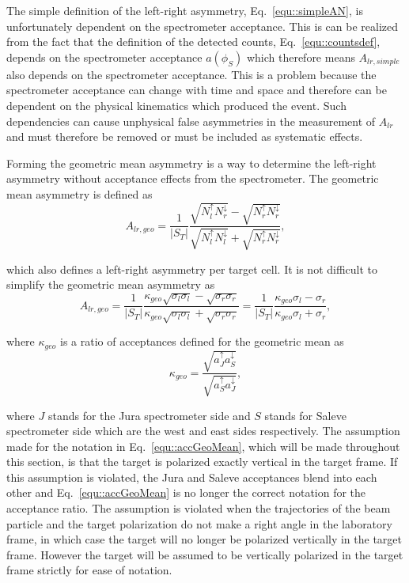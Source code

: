 The simple definition of the left-right asymmetry, Eq.~\ref{equ::simpleAN}, is
unfortunately dependent on the spectrometer acceptance.  This is can be realized
from the fact that the definition of the detected counts,
Eq.~\ref{equ::countsdef}, depends on the spectrometer acceptance $a(\phi_S)$
which therefore means $A_{lr,simple}$ also depends on the spectrometer
acceptance.  This is a problem because the spectrometer acceptance can change
with time and space and therefore can be dependent on the physical kinematics
which produced the event.  Such dependencies can cause unphysical false
asymmetries in the measurement of $A_{lr}$ and must therefore be removed or must
be included as systematic effects. \par

Forming the geometric mean asymmetry is a way to determine the left-right
asymmetry without acceptance effects from the spectrometer.  The geometric mean
asymmetry is defined as
\begin{equation}
  \label{equ::ANgeomean}
  A_{lr,geo} =
  \frac{1}{|S_T|}
  \frac{\sqrt{N_l^{\uparrow}N_r^{\downarrow}}
    - \sqrt{N_r^{\uparrow}N_r^{\downarrow}}
  }{
    \sqrt{N_l^{\uparrow}N_l^{\downarrow}}
    + \sqrt{N_r^{\uparrow}N_r^{\downarrow}} },
\end{equation}

\noindent
which also defines a left-right asymmetry per target cell.  It is not difficult
to simplify the geometric mean asymmetry as
\begin{equation}
  \label{equ::ANgeomean_expand}
  A_{lr,geo} = \frac{1}{|S_T|}\frac{\kappa_{geo}
    \sqrt{\sigma_l\sigma_l} -
    \sqrt{\sigma_r\sigma_r}}{\kappa_{geo}
    \sqrt{\sigma_l\sigma_l} + \sqrt{\sigma_r\sigma_r}}
  = \frac{1}{|S_T|}\frac{\kappa_{geo}\sigma_l - \sigma_r}{
    \kappa_{geo}\sigma_l + \sigma_r},
\end{equation}

\noindent
where $\kappa_{geo}$ is a ratio of acceptances defined for the geometric mean as
\begin{equation}
  \kappa_{geo} =
  \frac{
    \sqrt{a^\uparrow_J a^\downarrow_S}
    }{
    \sqrt{a^\uparrow_S a^\downarrow_J}
  },
  \label{equ::accGeoMean}
\end{equation}

\noindent
where $J$ stands for the Jura spectrometer side and $S$ stands for Saleve
spectrometer side which are the west and east sides respectively.  The
assumption made for the notation in Eq.~\ref{equ::accGeoMean}, which will be
made throughout this section, is that the target is polarized exactly vertical
in the target frame.  If this assumption is violated, the Jura and Saleve
acceptances blend into each other and Eq.~\ref{equ::accGeoMean} is no longer the
correct notation for the acceptance ratio.  The assumption is violated when the
trajectories of the beam particle and the target polarization do not make a
right angle in the laboratory frame, in which case the target will no longer be
polarized vertically in the target frame.  However the target will be assumed to
be vertically polarized in the target frame strictly for ease of notation.

